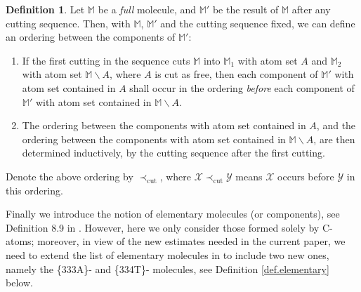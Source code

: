 \documentclass[10pt, reqno]{amsart}
\newcommand{\Mb}{\mathbb M}
\newcommand{\Xc}{\mathcal X}
\newcommand{\Yc}{\mathcal Y}
\theoremstyle{definition}
\newtheorem{definition}[theorem]{Definition}
\theoremstyle{remark}
\numberwithin{equation}{section}
\begin{document}
\begin{definition}\label{def.match_ends} Let $\Mb$ be a \emph{full} molecule, and $\Mb'$ be the result of $\Mb$ after any cutting sequence. Then, with $\Mb$, $\Mb'$ and the cutting sequence fixed, we can define an ordering between the components of $\Mb'$:
\begin{enumerate}
\item\label{it.comp_order_1} If the first cutting in the sequence cuts $\Mb$ into $\Mb_1$ with atom set $A$ and $\Mb_2$ with atom set $\Mb\backslash A$, where $A$ is cut as free, then each component of $\Mb'$ with atom set contained in $A$ shall occur in the ordering \emph{before} each component of $\Mb'$ with atom set contained in $\Mb\backslash A$.
\item\label{it.comp_order_2} The ordering between the components with atom set contained in $A$, and the ordering between the components with atom set contained in $\Mb\backslash A$, are then determined inductively, by the cutting sequence after the first cutting.
\end{enumerate}
Denote the above ordering by $\prec_{\mathrm{cut}}$, where $\Xc\prec_{\mathrm{cut}}\Yc$ means $\Xc$ occurs before $\Yc$ in this ordering.
\end{definition}
Finally we introduce the notion of elementary molecules (or components), see Definition 8.9 in \cite{DHM24}. However, here we only consider those formed solely by C-atoms; moreover, in view of the new estimates needed in the current paper, we need to extend the list of elementary molecules in \cite{DHM24} to include two new ones, namely the \{333A\}- and \{334T\}- molecules, see Definition \ref{def.elementary} below.
\end{document}
